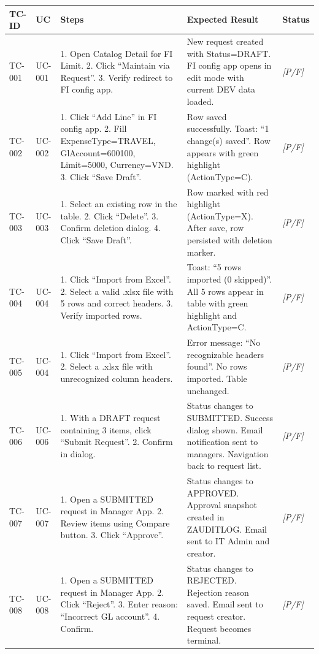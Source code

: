 \documentclass[12pt,a4paper]{report}
\newcommand{\placeholder}[1]{\textcolor{placeholderblue}{\textit{[#1]}}}
\begin{document}
\begin{table}[H]
\centering\small
\begin{tabularx}{\textwidth}{|l|l|X|X|l|}
  \hline
  \rowcolor{tableheadpeach}
  \textbf{TC-ID} & \textbf{UC} & \textbf{Steps} & \textbf{Expected Result} & \textbf{Status} \\ \hline
  TC-001 & UC-001 & 1. Open Catalog Detail for FI Limit. 2. Click ``Maintain via Request''. 3. Verify redirect to FI config app. & New request created with Status=DRAFT. FI config app opens in edit mode with current DEV data loaded. & \placeholder{P/F} \\ \hline
  TC-002 & UC-002 & 1. Click ``Add Line'' in FI config app. 2. Fill ExpenseType=TRAVEL, GlAccount=600100, Limit=5000, Currency=VND. 3. Click ``Save Draft''. & Row saved successfully. Toast: ``1 change(s) saved''. Row appears with green highlight (ActionType=C). & \placeholder{P/F} \\ \hline
  TC-003 & UC-003 & 1. Select an existing row in the table. 2. Click ``Delete''. 3. Confirm deletion dialog. 4. Click ``Save Draft''. & Row marked with red highlight (ActionType=X). After save, row persisted with deletion marker. & \placeholder{P/F} \\ \hline
  TC-004 & UC-004 & 1. Click ``Import from Excel''. 2. Select a valid .xlsx file with 5 rows and correct headers. 3. Verify imported rows. & Toast: ``5 rows imported (0 skipped)''. All 5 rows appear in table with green highlight and ActionType=C. & \placeholder{P/F} \\ \hline
  TC-005 & UC-004 & 1. Click ``Import from Excel''. 2. Select a .xlsx file with unrecognized column headers. & Error message: ``No recognizable headers found''. No rows imported. Table unchanged. & \placeholder{P/F} \\ \hline
  TC-006 & UC-006 & 1. With a DRAFT request containing 3 items, click ``Submit Request''. 2. Confirm in dialog. & Status changes to SUBMITTED. Success dialog shown. Email notification sent to managers. Navigation back to request list. & \placeholder{P/F} \\ \hline
  TC-007 & UC-007 & 1. Open a SUBMITTED request in Manager App. 2. Review items using Compare button. 3. Click ``Approve''. & Status changes to APPROVED. Approval snapshot created in ZAUDITLOG. Email sent to IT Admin and creator. & \placeholder{P/F} \\ \hline
  TC-008 & UC-008 & 1. Open a SUBMITTED request in Manager App. 2. Click ``Reject''. 3. Enter reason: ``Incorrect GL account''. 4. Confirm. & Status changes to REJECTED. Rejection reason saved. Email sent to request creator. Request becomes terminal. & \placeholder{P/F} \\ \hline

\end{tabularx}
\end{table}
\end{document}
